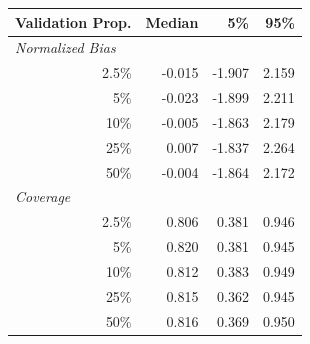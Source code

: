 
\begin{tabular}{r|rrr}
\toprule
Validation Prop. & Median & 5\% & 95\%\\
\midrule
\multicolumn{1}{l|}{\textit{Normalized Bias}}\\
2.5\% & -0.015 & -1.907 & 2.159\\
5\% & -0.023 & -1.899 & 2.211\\
10\% & -0.005 & -1.863 & 2.179\\
25\% & 0.007 & -1.837 & 2.264\\
50\% & -0.004 & -1.864 & 2.172\\
\midrule
%
\multicolumn{1}{l|}{\textit{Coverage}}\\
2.5\% & 0.806 & 0.381 & 0.946\\
5\% & 0.820 & 0.381 & 0.945\\
10\% & 0.812 & 0.383 & 0.949\\
25\% & 0.815 & 0.362 & 0.945\\
50\% & 0.816 & 0.369 & 0.950\\
\bottomrule
\end{tabular}

